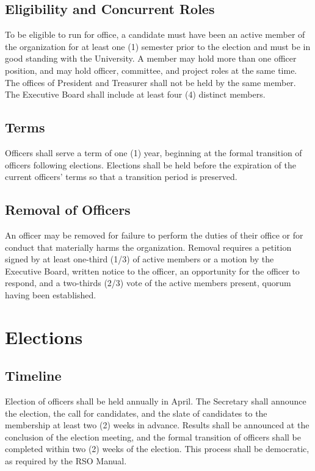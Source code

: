 \documentclass[12pt,letterpaper]{article} %
\begin{document}
\subsection{Eligibility and Concurrent Roles}\label{sec:officer-eligibility}
To be eligible to run for office, a candidate must have been an active member of the
organization for at least one (1) semester prior to the election and must be in good
standing with the University.
A member may hold more than one officer position, and may hold officer, committee, and project
roles at the same time. The offices of President and Treasurer shall not be held by the same
member. The Executive Board shall include at least four (4) distinct members.
\subsection{Terms}\label{sec:officer-terms}
Officers shall serve a term of one (1) year, beginning at the formal transition of officers
following elections. Elections shall be held before the expiration of the current officers'
terms so that a transition period is preserved.
\subsection{Removal of Officers}\label{sec:officer-removal}
An officer may be removed for failure to perform the duties of their office or for
conduct that materially harms the organization. Removal requires a petition signed by at
least one-third (1/3) of active members or a motion by the Executive Board, written notice
to the officer, an opportunity for the officer to respond, and a two-thirds (2/3) vote of
the active members present, quorum having been established.

\section{Elections}\label{art:elections} %
\subsection{Timeline}\label{sec:election-timeline}
Election of officers shall be held annually in April. The Secretary shall announce the
election, the call for candidates, and the slate of candidates to the membership at least two
(2) weeks in advance. Results shall be announced at the conclusion of the election meeting,
and the formal transition of officers shall be completed within two (2) weeks of the election.
This process shall be democratic, as required by the RSO Manual.
\end{document}
